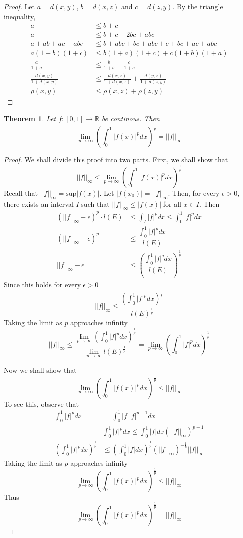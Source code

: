 \documentclass[12pt,leqno]{article}
\numberwithin{equation}{section}
\newtheorem{thm}{Theorem}[section]
\theoremstyle{definition}
\begin{document}
\begin{proof}
Let $a=d(x,y)$, $b=d(x,z)$ and $c=d(z,y)$. By the triangle inequality, \begin{align*}a&\leq b+c\\a&\leq b+c+2bc+abc\\a+ab+ac+abc&\leq b+abc+bc+abc+c+bc+ac+abc\\a(1+b)(1+c)&\leq b(1+a)(1+c)+c(1+b)(1+a)\\\frac{a}{1+a}&\leq\frac{b}{1+b}+\frac{c}{1+c}\\\frac{d(x,y)}{1+d(x,y)}&\leq\frac{d(x,z)}{1+d(x,z)}+\frac{d(y,z)}{1+d(z,y)}\\\rho(x,y)&\leq\rho(x,z)+\rho(z,y)\end{align*}
\end{proof}

\begin{thm}
 Let $f:[0,1]\to\mathbb{R}$ be continous. Then \[\lim_{p\to\infty}\left(\int_0^1|f(x)|^pdx\right)^{\frac{1}{p}}=||f||_{\infty}\]
\end{thm}

\begin{proof}
 We shall divide this proof into two parts. First, we shall show that \[||f||_{\infty}\leq\lim_{p\to\infty}\left(\int_0^1|f(x)|^pdx\right)^{\frac{1}{p}}\]Recall that $||f||_{\infty}=\text{sup}|f(x)|$. Let $|f(x_0)|=||f||_{\infty}$. Then, for every $\epsilon>0$, there exists an interval $I$ such that $||f||_{\infty}\leq|f(x)|$ for all $x\in I$. Then \begin{align*}(||f||_{\infty}-\epsilon)^p\cdot l(E)&\leq\int_I|f|^pdx\leq\int_0^1|f|^pdx\\(||f||_{\infty}-\epsilon)^p&\leq\dfrac{\int_0^1|f|^pdx}{l(E)}\\||f||_{\infty}-\epsilon&\leq\left(\dfrac{\int_0^1|f|^pdx}{l(E)}\right)^{\frac{1}{p}}\end{align*}Since this holds for every $\epsilon>0$\[||f||_{\infty}\leq\dfrac{\left(\int_0^1|f|^pdx\right)^{\frac{1}{p}}}{l(E)^{\frac{1}{p}}}\]Taking the limit as $p$ approaches infinity\[||f||_{\infty}\leq\dfrac{\displaystyle\lim_{p\to\infty}\left(\int_0^1|f|^pdx\right)^{\frac{1}{p}}}{\displaystyle\lim_{p\to\infty}l(E)^{\frac{1}{p}}}=\lim_{p\to\infty}\left(\int_0^1|f|^pdx\right)^{\frac{1}{p}}\]

Now we shall show that \[\lim_{p\to\infty}\left(\int_0^1|f(x)|^pdx\right)^{\frac{1}{p}}\leq||f||_{\infty}\] To see this, observe that \begin{align*}\int_0^1|f|^pdx&=\int_0^1|f||f|^{p-1}dx\\&\int_0^1|f|^pdx\leq\int_0^1|f|dx\left(||f||_{\infty}\right)^{p-1}\\\left(\int_0^1|f|^pdx\right)^{\frac{1}{p}}&\leq\left(\int_0^1|f|dx\right)^{\frac{1}{p}}(||f||_{\infty})^{-\frac{1}{p}}||f||_{\infty}\end{align*}Taking the limit as $p$ approaches infinity\[\lim_{p\to\infty}\left(\int_0^1|f(x)|^pdx\right)^{\frac{1}{p}}\leq||f||_{\infty}\] Thus \[\lim_{p\to\infty}\left(\int_0^1|f(x)|^pdx\right)^{\frac{1}{p}}=||f||_{\infty}\]
\end{proof}
\end{document}
